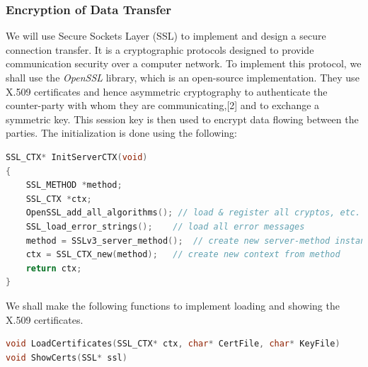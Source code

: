 \documentclass{article}
\begin{document}
				\subsubsection{Encryption of Data Transfer}
				We will use Secure Sockets Layer (SSL) to implement and design a secure connection transfer. It is a cryptographic protocols designed to provide communication security over a computer network. To implement this protocol, we shall use the \textit{OpenSSL} library, which is an open-source implementation. They use X.509 certificates and hence asymmetric cryptography to authenticate the counter-party with whom they are communicating,[2] and to exchange a symmetric key. This session key is then used to encrypt data flowing between the parties. 
				\newline
				The initialization is done using the following:
				\begin{lstlisting}[language=C++, caption={Initialization}]
SSL_CTX* InitServerCTX(void)
{   
	SSL_METHOD *method;
    SSL_CTX *ctx; 
    OpenSSL_add_all_algorithms(); // load & register all cryptos, etc.
    SSL_load_error_strings();    // load all error messages
    method = SSLv3_server_method();  // create new server-method instance 
    ctx = SSL_CTX_new(method);   // create new context from method 
    return ctx;
}
				\end{lstlisting}

				We shall make the following functions to implement loading and showing the X.509 certificates.

				\begin{lstlisting}[language=C++, caption={X.509 Certificates}]
void LoadCertificates(SSL_CTX* ctx, char* CertFile, char* KeyFile)
void ShowCerts(SSL* ssl)
				\end{lstlisting}
\end{document}
